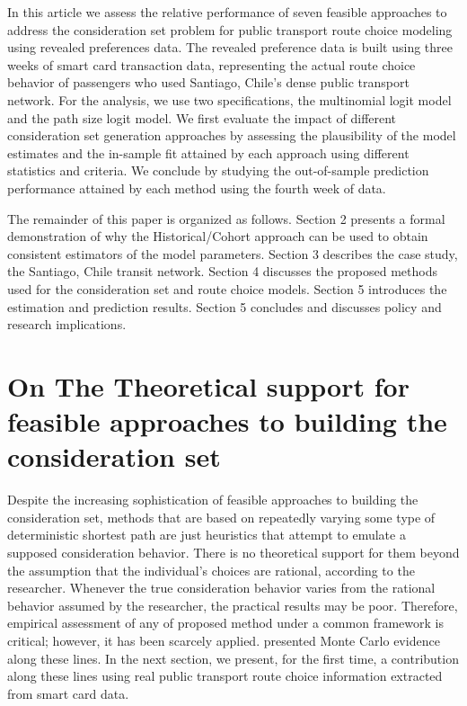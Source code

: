 \documentclass[12pt,a4paper]{article}
\begin{document}
In this article we assess the relative performance of seven feasible approaches to address the consideration set problem for public transport route choice modeling using revealed preferences data. The revealed preference data is built using three weeks of smart card transaction data, representing the actual route choice behavior of passengers who used Santiago, Chile’s dense public transport network. For the analysis, we use two specifications, the multinomial logit model and the path size logit model. We first evaluate the impact of different consideration set generation approaches by assessing the plausibility of the model estimates and the in-sample fit attained by each approach using different statistics and criteria. We conclude by studying the out-of-sample prediction performance attained by each method using the fourth week of data.

The remainder of this paper is organized as follows. Section 2 presents a formal demonstration of why the Historical/Cohort approach can be used to obtain consistent estimators of the model parameters. Section 3 describes the case study, the Santiago, Chile transit network. Section 4 discusses the proposed methods used for the consideration set and route choice models. Section 5 introduces the estimation and prediction results. Section 5 concludes and discusses policy and research implications.

\section{On The Theoretical support for feasible approaches to building the consideration set}

Despite the increasing sophistication of feasible approaches to building the consideration set, methods that are based on repeatedly varying some type of deterministic shortest path are just heuristics that attempt to emulate a supposed consideration behavior. There is no theoretical support for them beyond the assumption that the individual’s choices are rational, according to the researcher. Whenever the true consideration behavior varies from the rational behavior assumed by the researcher, the practical results may be poor. Therefore, empirical assessment of any of proposed method under a common framework is critical; however, it has been scarcely applied. \cite{villalobostesis2021} presented Monte Carlo evidence along these lines. In the next section, we present, for the first time, a contribution along these lines using real public transport route choice information extracted from smart card data.
\end{document}
